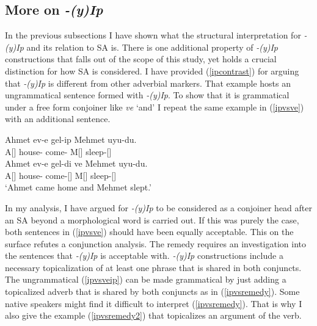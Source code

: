 \subsection{More on \textit{-(y)Ip}} \label{moreonyip}

In the previous subsections I have shown what the structural interpretation for \textit{-(y)Ip} and its relation to SA is. There is one additional property of \textit{-(y)Ip} constructions that falls out of the scope of this study, yet holds a crucial distinction for how SA is considered. I have provided (\ref{ipcontrast}) for arguing that \textit{-(y)Ip} is different from other adverbial markers. That example hosts an ungrammatical sentence formed with \textit{-(y)Ip}. To show that it is grammatical under a free form conjoiner like \textit{ve} `and' I repeat the same example in (\ref{ipvsve}) with an additional sentence.

\begin{exe}
\ex \label{ipvsve}
    \begin{xlist}
        \ex \label{ipvsveip}
        \gll *Ahmet ev-e gel-ip Mehmet uyu-du. \\ 
        A[{\Nom}] house-{\Dat} come-{\Pc} M[{\Nom}] sleep-{\Pst}[{\Tsg}]\\

        \ex \gll Ahmet ev-e gel-di ve Mehmet uyu-du. \\ 
        A[{\Nom}] house-{\Dat} come-{\Pst}[{\Tsg}] {\And} M[{\Nom}] sleep-{\Pst}[{\Tsg}] \\
        \glt `Ahmet came home and Mehmet slept.'
    \end{xlist}
\end{exe}

In my analysis, I have argued for \textit{-(y)Ip} to be considered as a conjoiner head after an SA beyond a morphological word is carried out. If this was purely the case, both sentences in (\ref{ipvsve}) should have been equally acceptable. This on the surface refutes a conjunction analysis. The remedy requires an investigation into the sentences that \textit{-(y)Ip} is acceptable with. \textit{-(y)Ip} constructions include a necessary topicalization of at least one phrase that is shared in both conjuncts. The ungrammatical (\ref{ipvsveip}) can be made grammatical by just adding a topicalized adverb that is shared by both conjuncts as in (\ref{ipvsremedy}). Some native speakers might find it difficult to interpret (\ref{ipvsremedy}). That is why I also give the example (\ref{ipvsremedy2}) that topicalizes an argument of the verb.

